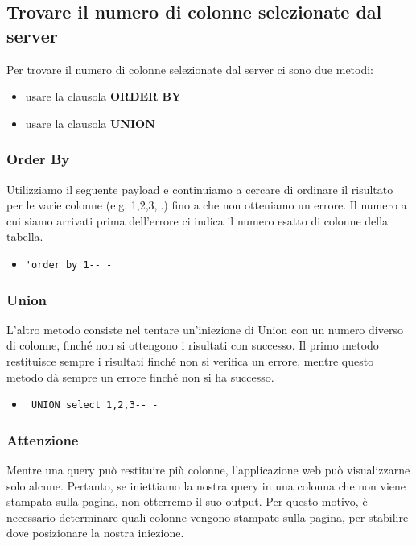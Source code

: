\subsection{Trovare il numero di colonne selezionate dal server}
Per trovare il numero di colonne selezionate dal server ci sono due metodi:
\begin{itemize}
    \item usare la clausola \textbf{ORDER BY}
    \item usare la clausola \textbf{UNION}
\end{itemize}

\subsubsection{Order By}
Utilizziamo il seguente payload e continuiamo a cercare di ordinare il risultato per le varie colonne (e.g. 1,2,3,..) fino a che non otteniamo un errore. Il numero a cui siamo arrivati prima dell'errore ci indica il numero esatto di colonne della tabella.
\begin{itemize}
    \item \begin{verbatim}'order by 1-- -\end{verbatim}
\end{itemize}

\subsubsection{Union}
L'altro metodo consiste nel tentare un'iniezione di Union con un numero diverso di colonne, finché non si ottengono i risultati con successo. Il primo metodo restituisce sempre i risultati finché non si verifica un errore, mentre questo metodo dà sempre un errore finché non si ha successo.
\begin{itemize}
    \item \begin{verbatim} UNION select 1,2,3-- -\end{verbatim}
\end{itemize}

\subsubsection{Attenzione}
Mentre una query può restituire più colonne, l'applicazione web può visualizzarne solo alcune. Pertanto, se iniettiamo la nostra query in una colonna che non viene stampata sulla pagina, non otterremo il suo output. Per questo motivo, è necessario determinare quali colonne vengono stampate sulla pagina, per stabilire dove posizionare la nostra iniezione.

